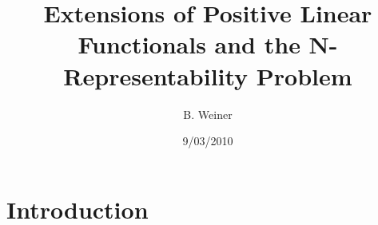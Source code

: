 \documentclass[aps,preprint]{revtex4}%
\begin{document}
\preprint{ }
\title[Positive Functionals]{Extensions of Positive Linear Functionals and the N-Representability Problem }
\author{B. Weiner}

\begin{abstract}


\end{abstract}
\date{9/03/2010}
\maketitle
\tableofcontents


\section{Introduction}
\end{document}

